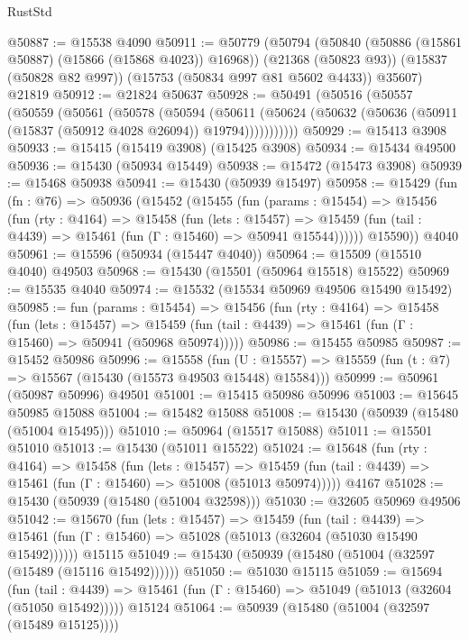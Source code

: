 \begin{lexlean}{RustStd}
\begin{coremodule}
@50887 := @15538 @4090
@50911 := @50779
    (@50794
      (@50840 (@50886 (@15861 @50887) (@15866 (@15868 @4023)) @16968))
      (@21368 (@50823 @93))
      (@15837 (@50828 @82 @997))
      (@15753 (@50834 @997 @81 @5602 @4433))
      @35607)
    @21819
@50912 := @21824 @50637
@50928 := @50491
    (@50516
      (@50557
        (@50559
          (@50561
            (@50578
              (@50594
                (@50611
                  (@50624 (@50632 (@50636 (@50911 (@15837 (@50912 @4028 @26094)) @19794)))))))))))
@50929 := @15413 @3908
@50933 := @15415 (@15419 @3908) (@15425 @3908)
@50934 := @15434 @49500
@50936 := @15430 (@50934 @15449)
@50938 := @15472 (@15473 @3908)
@50939 := @15468 @50938
@50941 := @15430 (@50939 @15497)
@50958 := @15429
    (fun (fn : @76) =>
    @50936
      (@15452
        (@15455
          (fun (params : @15454) =>
          @15456
            (fun (rty : @4164) =>
            @15458
              (fun (lets : @15457) =>
              @15459 (fun (tail : @4439) => @15461 (fun (Γ : @15460) => @50941 @15544))))))
        @15590))
    @4040
@50961 := @15596 (@50934 (@15447 @4040))
@50964 := @15509 (@15510 @4040) @49503
@50968 := @15430 (@15501 (@50964 @15518) @15522)
@50969 := @15535 @4040
@50974 := @15532 (@15534 @50969 @49506 @15490 @15492)
@50985 := fun (params : @15454) =>
  @15456
    (fun (rty : @4164) =>
    @15458
      (fun (lets : @15457) =>
      @15459 (fun (tail : @4439) => @15461 (fun (Γ : @15460) => @50941 (@50968 @50974)))))
@50986 := @15455 @50985
@50987 := @15452 @50986
@50996 := @15558
    (fun (U : @15557) => @15559 (fun (t : @7) => @15567 (@15430 (@15573 @49503 @15448) @15584)))
@50999 := @50961 (@50987 @50996) @49501
@51001 := @15415 @50986 @50996
@51003 := @15645 @50985 @15088
@51004 := @15482 @15088
@51008 := @15430 (@50939 (@15480 (@51004 @15495)))
@51010 := @50964 (@15517 @15088)
@51011 := @15501 @51010
@51013 := @15430 (@51011 @15522)
@51024 := @15648
    (fun (rty : @4164) =>
    @15458
      (fun (lets : @15457) =>
      @15459 (fun (tail : @4439) => @15461 (fun (Γ : @15460) => @51008 (@51013 @50974)))))
    @4167
@51028 := @15430 (@50939 (@15480 (@51004 @32598)))
@51030 := @32605 @50969 @49506
@51042 := @15670
    (fun (lets : @15457) =>
    @15459
      (fun (tail : @4439) =>
      @15461 (fun (Γ : @15460) => @51028 (@51013 (@32604 (@51030 @15490 @15492))))))
    @15115
@51049 := @15430 (@50939 (@15480 (@51004 (@32597 (@15489 (@15116 @15492))))))
@51050 := @51030 @15115
@51059 := @15694
    (fun (tail : @4439) => @15461 (fun (Γ : @15460) => @51049 (@51013 (@32604 (@51050 @15492)))))
    @15124
@51064 := @50939 (@15480 (@51004 (@32597 (@15489 @15125))))

\end{coremodule}
\end{lexlean}

